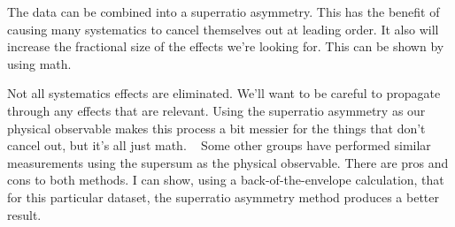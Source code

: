 The data can be combined into a superratio asymmetry.  This has the benefit of causing many systematics to cancel themselves out at leading order.  It also will increase the fractional size of the effects we're looking for.  This can be shown by using math.~

Not all systematics effects are eliminated.  We'll want to be careful to propagate through any effects that are relevant.  Using the superratio asymmetry as our physical observable makes this process a bit messier for the things that don't cancel out, but it's all just math.
~
Some other groups have performed similar measurements using the supersum as the physical observable.  There are pros and cons to both methods.  I can show, using a back-of-the-envelope calculation, that for this particular dataset, the superratio asymmetry method produces a better result.  

